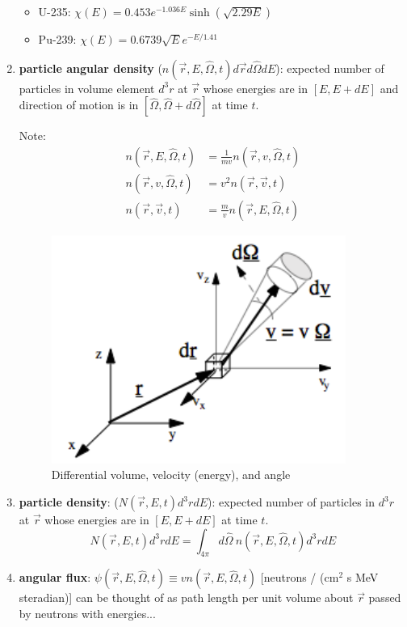 \documentclass[12pt]{article}
\newcommand{\vOmega}{\ensuremath{\hat{\Omega}}}
\begin{document}
\begin{enumerate}
\begin{itemize}
\item U-235: $\chi(E) = 0.453 e^{-1.036E} \sinh(\sqrt{2.29E})$
\item Pu-239: $\chi(E) = 0.6739 \sqrt{E} e^{-E / 1.41}$
\end{itemize}

\item \textbf{particle angular density} ($n(\vec{r}, E, \vOmega, t)d\vec{r} d\vOmega dE$): expected number of particles in volume element $d^3r$ at $\vec{r}$ whose energies are in $[E, E + dE]$ and direction of motion is in $[\vOmega, \vOmega + d\vOmega]$ at time $t$.

Note:
\begin{align*}
n(\vec{r}, E, \vOmega, t) &= \frac{1}{mv}n(\vec{r}, v, \vOmega, t) \\
n(\vec{r}, v, \vOmega, t) &= v^2 n(\vec{r}, \vec{v}, t) \\
n(\vec{r}, \vec{v}, t) &= \frac{m}{v}n(\vec{r}, E, \vOmega, t)
\end{align*}
\begin{figure}[h!]
    \begin{center}
    \includegraphics[keepaspectratio, width = 2.5 in]{differential-element}
    \end{center}
    \caption{Differential volume, velocity (energy), and angle}
    \label{fig:phase_space}
\end{figure}

\item \textbf{particle density}: ($N(\vec{r},E,t)d^3r dE$): expected number of particles in $d^3r$ at $\vec{r}$ whose energies are in $[E, E + dE]$ at time $t$.
\[N(\vec{r},E,t)d^3r dE = \int_{4\pi} d\vOmega\: n(\vec{r}, E, \vOmega, t)d^3r dE \]

\item \textbf{angular flux}: $\psi(\vec{r}, E, \vOmega, t) \equiv v n(\vec{r}, E, \vOmega, t)$ [neutrons / (cm$^2$ s MeV steradian)] can be thought of as path length per unit volume about $\vec{r}$ passed by neutrons with energies...


\end{enumerate}
\end{document}

